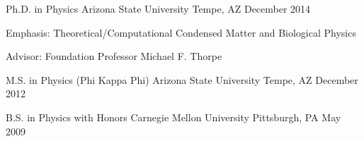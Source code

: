 

\begin{cventries}

  \cventry
    {Ph.D. in Physics} %
    {Arizona State University} %
    {Tempe, AZ} %
    {December 2014} %
    {
      \begin{cvitems} %
        \item {Emphasis: Theoretical/Computational Condensed Matter and Biological Physics}
        \item {Advisor: Foundation Professor Michael F. Thorpe}
      \end{cvitems}
    }

 \cventry
    {M.S. in Physics (Phi Kappa Phi)} %
    {Arizona State University} %
    {Tempe, AZ} %
    {December 2012} %
    {}

  \cventry
    {B.S. in Physics with Honors} %
    {Carnegie Mellon University} %
    {Pittsburgh, PA} %
    {May 2009} %
    {}



\end{cventries}
